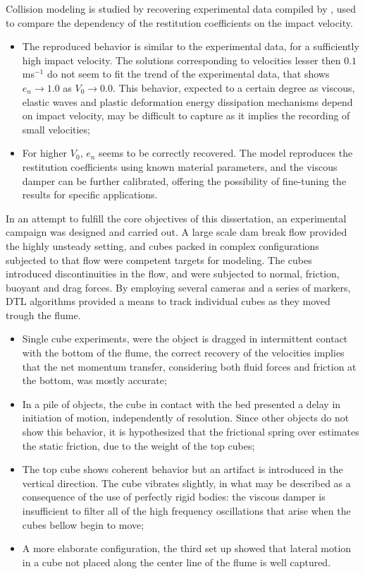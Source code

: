 Collision modeling is studied by recovering experimental data compiled by \cite{Kruggel-Emden-2007}, used to compare the dependency of the restitution coefficients on the impact velocity.

\begin{itemize}
\item The reproduced behavior is similar to the experimental data, for a sufficiently high impact velocity. The solutions corresponding to velocities lesser then $0.1$ ms$^{-1}$ do not seem to fit the trend of the experimental data, that shows $e_n\rightarrow1.0$ as $V_0\rightarrow0.0$. This behavior, expected to a certain degree as viscous, elastic waves and plastic deformation energy dissipation mechanisms depend on impact velocity, may be difficult to capture as it implies the recording of small velocities;
\item For higher $V_0$, $e_n$ seems to be correctly recovered. The model reproduces the restitution coefficients using known material parameters, and the viscous damper can be further calibrated, offering the possibility of fine-tuning the results for specific applications.
\end{itemize}

In an attempt to fulfill the core objectives of this dissertation, an experimental campaign was designed and carried out. A large scale dam break flow provided the highly unsteady setting, and cubes packed in complex configurations subjected to that flow were competent targets for modeling. The cubes introduced discontinuities in the flow, and were subjected to normal, friction, buoyant and drag forces. By employing several cameras and a series of markers, \ac{DTL} algorithms provided a means to track individual cubes as they moved trough the flume. 

\begin{itemize}
\item Single cube experiments, were the object is dragged in intermittent contact with the bottom of the flume, the correct recovery of the velocities implies that the net momentum transfer, considering both fluid forces and friction at the bottom, was mostly accurate;
\item In a pile of objects, the cube in contact with the bed presented a delay in initiation of motion, independently of resolution. Since other objects do not show this behavior, it is hypothesized that the frictional spring over estimates the static friction, due to the weight of the top cubes;
\item The top cube shows coherent behavior but an artifact is introduced in the vertical direction. The cube vibrates slightly, in what may be described as a consequence of the use of perfectly rigid bodies: the viscous damper is insufficient to filter all of the high frequency oscillations that arise when the cubes bellow begin to move;
\item A more elaborate configuration, the third set up showed that lateral motion in a cube not placed along the center line of the flume is well captured. 
\end{itemize}

